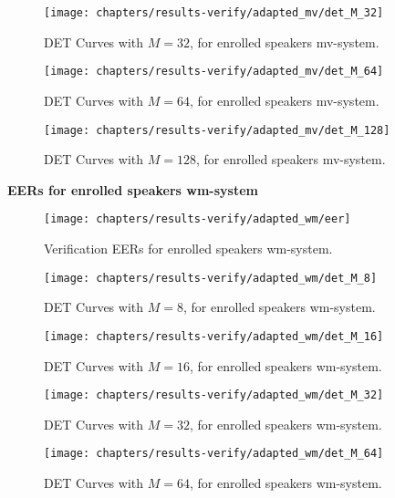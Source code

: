 \begin{figure}[ht]
	\centering
	\texttt{[image: chapters/results-verify/adapted\_mv/det\_M\_32]}
	\caption{DET Curves with $M = 32$, for enrolled speakers mv-system.}
	\label{fig:results-verify-adapted_mv-M_32}
\end{figure}

\begin{figure}[ht]
	\centering
	\texttt{[image: chapters/results-verify/adapted\_mv/det\_M\_64]}
	\caption{DET Curves with $M = 64$, for enrolled speakers mv-system.}
	\label{fig:results-verify-adapted_mv-M_64}
\end{figure}

\clearpage
\begin{figure}[ht]
	\centering
	\texttt{[image: chapters/results-verify/adapted\_mv/det\_M\_128]}
	\caption{DET Curves with $M = 128$, for enrolled speakers mv-system.}
	\label{fig:results-verify-adapted_mv-M_128}
\end{figure}

\newpage
\noindent \textbf{EERs for enrolled speakers wm-system}



\begin{figure}[ht]
	\centering
	\texttt{[image: chapters/results-verify/adapted\_wm/eer]}
	\caption{Verification EERs for enrolled speakers  wm-system.}
	\label{fig:results-verify-adapted_wm}
\end{figure}

\begin{figure}[ht]
	\centering
	\texttt{[image: chapters/results-verify/adapted\_wm/det\_M\_8]}
	\caption{DET Curves with $M = 8$, for enrolled speakers wm-system.}
	\label{fig:results-verify-adapted_wm-M_8}
\end{figure}

\begin{figure}[ht]
	\centering
	\texttt{[image: chapters/results-verify/adapted\_wm/det\_M\_16]}
	\caption{DET Curves with $M = 16$, for enrolled speakers wm-system.}
	\label{fig:results-verify-adapted_wm-M_16}
\end{figure}

\begin{figure}[ht]
	\centering
	\texttt{[image: chapters/results-verify/adapted\_wm/det\_M\_32]}
	\caption{DET Curves with $M = 32$, for enrolled speakers wm-system.}
	\label{fig:results-verify-adapted_wm-M_32}
\end{figure}

\begin{figure}[ht]
	\centering
	\texttt{[image: chapters/results-verify/adapted\_wm/det\_M\_64]}
	\caption{DET Curves with $M = 64$, for enrolled speakers wm-system.}
	\label{fig:results-verify-adapted_wm-M_64}
\end{figure}

